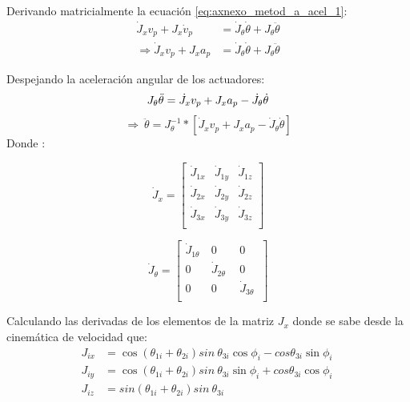             Derivando matricialmente la ecuación \ref{eq:axnexo_metod_a_acel_1}:
            \begin{align*}
                 \dot{J}_{x}v_{p}+J_{x}\dot{v}_{p}&=\dot{J}_{ \theta }\dot{ \theta }+J_{ \theta }\ddot{ \theta }\\
                 \Longrightarrow \dot{J}_{x}v_{p}+J_{x}a_{p}&=\dot{J}_{ \theta }\dot{ \theta }+J_{ \theta }\ddot{ \theta }
            \end{align*}
            
            Despejando la aceleración angular de los actuadores:
            \begin{equation*}
             J_{ \theta }\ddot{ \theta }=\dot{J}_{x}v_{p}+J_{x}a_{p}-\dot{J}_{ \theta }\dot{ \theta } \\
            \end{equation*}
            \begin{equation}
             \Longrightarrow~\ddot{ \theta }=J_{ \theta }^{-1}\ast \left[ \dot{J}_{x}v_{p}+J_{x}a_{p}-\dot{J}_{ \theta }\dot{ \theta } \right]       
             \label{eq:finalanexoacelmeta}
            \end{equation}
            Donde :

  \begin{equation*}
            \dot{J}_{x}= \left[ \begin{matrix}
            \dot{J}_{1x}  &  \dot{J}_{1y}  &  \dot{J}_{1z}\\
            \dot{J}_{2x}  &  \dot{J}_{2y}  &  \dot{J}_{2z}\\
            \dot{J}_{3x}  &  \dot{J}_{3y}  &  \dot{J}_{3z}\\
            \end{matrix}
             \right]
  \end{equation*}
  
  \begin{equation*}
\dot{J}_{ \theta }= \left[ \begin{matrix}
            \dot{J}_{1 \theta }~  &  0  &  0\\
            0  &  \dot{J}_{2 \theta }~~  &  0\\
            0  &  0  &  \dot{J}_{3 \theta }~\\
            \end{matrix}
             \right] 
     \end{equation*}
         
            Calculando las derivadas de los elementos de la matriz  $J_{x}$ donde se sabe desde la cinemática de velocidad que:
            \begin{align*}
              J_{ix}&=\cos  \left(  \theta _{1i}+ \theta _{2i} \right) sin~ \theta _{3i}\cos  \phi _{i}-cos  \theta _{3i}\sin  \phi _{i}~  \\
              J_{iy}&=\cos  \left(  \theta _{1i}+ \theta _{2i} \right) sin~ \theta _{3i}\sin  \phi _{i}+ cos  \theta _{3i}\cos  \phi _{i}~  \\
              J_{iz}&=sin \left(  \theta _{1i}+ \theta _{2i} \right) sin~ \theta _{3i}~  
            \end{align*}\
            

